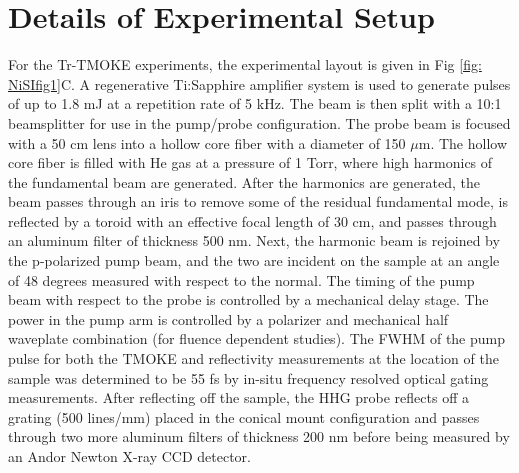 \section{Details of Experimental Setup}
For the Tr-TMOKE experiments, the experimental layout is given in Fig \ref{fig: NiSIfig1}C. A regenerative Ti:Sapphire amplifier system is used to generate pulses of up to 1.8 mJ at a repetition rate of 5 kHz. The beam is then split with a 10:1 beamsplitter for use in the pump/probe configuration. The probe beam is focused with a 50 cm lens into a hollow core fiber with a diameter of 150 $\mu$m. The hollow core fiber is filled with He gas at a pressure of 1 Torr, where high harmonics of the fundamental beam are generated. After the harmonics are generated, the beam passes through an iris to remove some of the residual fundamental mode, is reflected by a toroid with an effective focal length of 30 cm, and passes through an aluminum filter of thickness 500 nm. Next, the harmonic beam is rejoined by the p-polarized pump beam, and the two are incident on the sample at an angle of 48 degrees measured with respect to the normal. The timing of the pump beam with respect to the probe is controlled by a mechanical delay stage. The power in the pump arm is controlled by a polarizer and mechanical half waveplate combination (for fluence dependent studies). The FWHM of the pump pulse for both the TMOKE and reflectivity measurements at the location of the sample was determined to be 55 fs by in-situ frequency resolved optical gating measurements. After reflecting off the sample, the HHG probe reflects off a grating (500 lines/mm) placed in the conical mount configuration and passes through two more aluminum filters of thickness 200 nm before being measured by an Andor Newton X-ray CCD detector.

